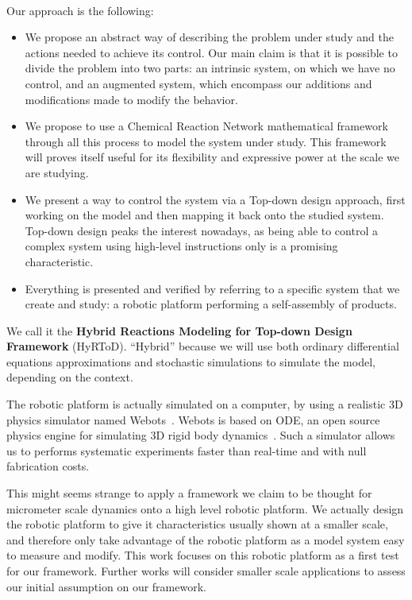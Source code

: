 	\paragraph{}
	Our approach is the following:
	\begin{itemize}
		\item We propose an abstract way of describing the problem under study and the actions needed to achieve its control. Our main claim is that it is possible to divide the problem into two parts: an intrinsic system, on which we have no control, and an augmented system, which encompass our additions and modifications made to modify the behavior.
		\item We propose to use a Chemical Reaction Network mathematical framework through all this process to model the system under study. This framework will proves itself useful for its flexibility and expressive power at the scale we are studying.
		\item We present a way to control the system via a Top-down design approach, first working on the model and then mapping it back onto the studied system. Top-down design peaks the interest nowadays, as being able to control a complex system using high-level instructions only is a promising characteristic.
		\item Everything is presented and verified by referring to a specific system that we create and study: a robotic platform performing a self-assembly of products.
	\end{itemize}
	
	We call it the \textbf{Hybrid Reactions Modeling for Top-down Design Framework} (HyRToD). ``Hybrid'' because we will use both ordinary differential equations approximations and stochastic simulations to simulate the model, depending on the context.
	
	The robotic platform is actually simulated on a computer, by using a realistic 3D physics simulator named Webots~\cite{Michel:2004p10762}. Webots is based on ODE, an open source physics engine for simulating 3D rigid body dynamics~\cite{ode}. Such a simulator allows us to performs systematic experiments faster than real-time and with null fabrication costs.
	
	This might seems strange to apply a framework we claim to be thought for micrometer scale dynamics onto a high level robotic platform. We actually design the robotic platform to give it characteristics usually shown at a smaller scale, and therefore only take advantage of the robotic platform as a model system easy to measure and modify. This work focuses on this robotic platform as a first test for our framework. Further works will consider smaller scale applications to assess our initial assumption on our framework.
	
